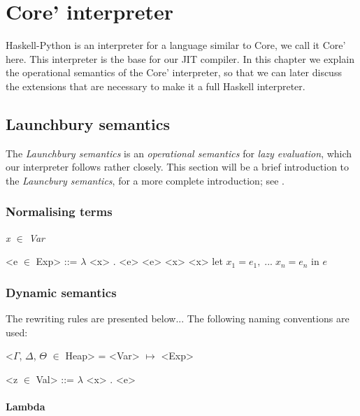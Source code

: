 
\chapter{Core' interpreter}


Haskell-Python is an interpreter for a language similar to Core, we call it Core' here.
This interpreter is the base for our JIT compiler. In this chapter we explain the 
operational semantics of the Core' interpreter, so that we can later discuss the 
extensions that are necessary to make it a full Haskell interpreter.


\section{Launchbury semantics}

The \emph{Launchbury semantics} is an \emph{operational semantics} for \emph{lazy evaluation}, 
which our interpreter follows rather closely. This section
will be a brief introduction to the \emph{Launcbury semantics}, for a more complete introduction;
see \cite{launchbury1993natural}. 

\subsection{Normalising terms}

\normalfont\itshape 
x $\in$ Var 
\normalfont
\begin{grammar}
 <e $\in$ Exp> ::= $\lambda$ <x> . <e>
              \alt <e> <x>
              \alt <x>
              \alt let $x_1 = e_1, \; ... \; x_n = e_n$ in $e$
\end{grammar}


\subsection{Dynamic semantics}

The rewriting rules are presented below... The following naming conventions
are used:

\begin{grammar}
<$\Gamma$, $\Delta$, $\Theta$ $\in$ Heap> = <Var> $\mapsto$ <Exp>

<z $\in$ Val> ::= $\lambda$ <x> . <e>
\end{grammar}

\subsubsection{Lambda}


